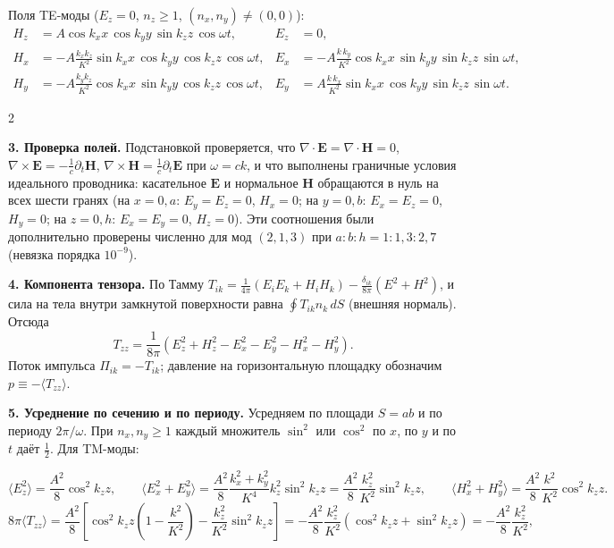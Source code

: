 \documentclass[twoside, 10pt]{article}
\begin{document}
Поля TE-моды ($E_z=0$, $n_z\ge1$, $(n_x,n_y)\ne(0,0)$):
\[
\begin{aligned}
H_z&=A\cos k_xx\,\cos k_yy\,\sin k_zz\,\cos\omega t, &
E_z&=0,\\
H_x&=-A\frac{k_xk_z}{K^2}\sin k_xx\,\cos k_yy\,\cos k_zz\,\cos\omega t, &
E_x&=-A\frac{k\,k_y}{K^2}\cos k_xx\,\sin k_yy\,\sin k_zz\,\sin\omega t,\\
H_y&=-A\frac{k_yk_z}{K^2}\cos k_xx\,\sin k_yy\,\cos k_zz\,\cos\omega t, &
E_y&=A\frac{k\,k_x}{K^2}\sin k_xx\,\cos k_yy\,\sin k_zz\,\sin\omega t.
\end{aligned}
\]
\begin{multicols}{2}

\textbf{3. Проверка полей.} Подстановкой проверяется, что
$\nabla\cdot\mathbf E=\nabla\cdot\mathbf H=0$,
$\nabla\times\mathbf E=-\frac1c\partial_t\mathbf H$,
$\nabla\times\mathbf H=\frac1c\partial_t\mathbf E$ при $\omega=ck$, и что выполнены
граничные условия идеального проводника: касательное $\mathbf E$ и нормальное
$\mathbf H$ обращаются в нуль на всех шести гранях (на $x=0,a$: $E_y=E_z=0$, $H_x=0$;
на $y=0,b$: $E_x=E_z=0$, $H_y=0$; на $z=0,h$: $E_x=E_y=0$, $H_z=0$). Эти соотношения
были дополнительно проверены численно для мод $(2,1,3)$ при $a:b:h=1:1{,}3:2{,}7$
(невязка порядка $10^{-9}$).

\textbf{4. Компонента тензора.} По Тамму
$T_{ik}=\frac1{4\pi}(E_iE_k+H_iH_k)-\frac{\delta_{ik}}{8\pi}(E^2+H^2)$, и сила на тела
внутри замкнутой поверхности равна $\oint T_{ik}n_k\,dS$ (внешняя нормаль). Отсюда
\[
T_{zz}=\frac1{8\pi}\left(E_z^2+H_z^2-E_x^2-E_y^2-H_x^2-H_y^2\right).
\]
Поток импульса $\Pi_{ik}=-T_{ik}$; давление на горизонтальную площадку обозначим
$p\equiv-\langle T_{zz}\rangle$.

\textbf{5. Усреднение по сечению и по периоду.} Усредняем по площади $S=ab$ и по
периоду $2\pi/\omega$. При $n_x,n_y\ge1$ каждый множитель $\sin^2$ или $\cos^2$ по
$x$, по $y$ и по $t$ даёт $\tfrac12$. Для TM-моды:
\end{multicols}
\[
\langle E_z^2\rangle=\frac{A^2}{8}\cos^2k_zz,\qquad
\langle E_x^2+E_y^2\rangle=\frac{A^2}{8}\frac{k_x^2+k_y^2}{K^4}k_z^2\sin^2k_zz=\frac{A^2}{8}\frac{k_z^2}{K^2}\sin^2k_zz,\qquad
\langle H_x^2+H_y^2\rangle=\frac{A^2}{8}\frac{k^2}{K^2}\cos^2k_zz .
\]
\[
8\pi\langle T_{zz}\rangle=\frac{A^2}{8}\left[\cos^2k_zz\left(1-\frac{k^2}{K^2}\right)-\frac{k_z^2}{K^2}\sin^2k_zz\right]
=-\frac{A^2}{8}\frac{k_z^2}{K^2}\left(\cos^2k_zz+\sin^2k_zz\right)=-\frac{A^2}{8}\frac{k_z^2}{K^2},
\]
\end{document}
